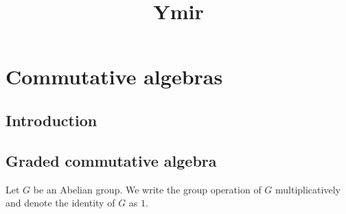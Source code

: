 
\title{Ymir}

\maketitle
\tableofcontents



\chapter*{Commutative algebras}\label{chap-commutative}


\section{Introduction}\label{sec-introduction}

\section{Graded commutative algebra}
Let $G$ be an Abelian group. We write the group operation of $G$ multiplicatively and denote the identity of $G$ as $1$.

